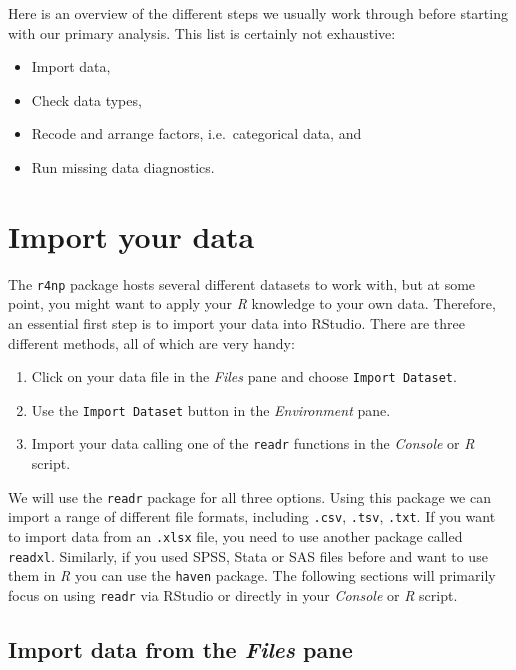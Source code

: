 \documentclass[
  letterpaper,
]{krantz}
\begin{document}
Here is an overview of the different steps we usually work through
before starting with our primary analysis. This list is certainly not
exhaustive:

\begin{itemize}
\item
  Import data,
\item
  Check data types,
\item
  Recode and arrange factors, i.e.~categorical data, and
\item
  Run missing data diagnostics.
\end{itemize}

\section{Import your data}\label{sec-import-your-data}

The \texttt{r4np} package hosts several different datasets to work with,
but at some point, you might want to apply your \emph{R} knowledge to
your own data. Therefore, an essential first step is to import your data
into RStudio. There are three different methods, all of which are very
handy:

\begin{enumerate}
\def\labelenumi{\arabic{enumi}.}
\item
  Click on your data file in the \emph{Files} pane and choose
  \texttt{Import\ Dataset}.
\item
  Use the \texttt{Import\ Dataset} button in the \emph{Environment}
  pane.
\item
  Import your data calling one of the \texttt{readr} functions in the
  \emph{Console} or \emph{R} script.
\end{enumerate}

We will use the \texttt{readr} package for all three options. Using this
package we can import a range of different file formats, including
\texttt{.csv}, \texttt{.tsv}, \texttt{.txt}. If you want to import data
from an \texttt{.xlsx} file, you need to use another package called
\texttt{readxl}. Similarly, if you used SPSS, Stata or SAS files before
and want to use them in \emph{R} you can use the \texttt{haven} package.
The following sections will primarily focus on using \texttt{readr} via
RStudio or directly in your \emph{Console} or \emph{R} script.

\subsection{\texorpdfstring{Import data from the \emph{Files}
pane}{Import data from the Files pane}}\label{import-data-from-the-files-pane}
\end{document}
